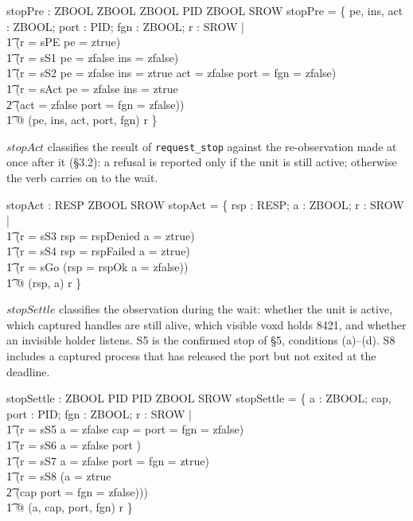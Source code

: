 \documentclass[a4paper,10pt,fleqn]{article}
\begin{document}
\begin{axdef}
  stopPre : ZBOOL \cross ZBOOL \cross ZBOOL \cross \power PID \cross ZBOOL
    \rel SROW
\where
  stopPre = \{ pe, ins, act : ZBOOL; port : \power PID; fgn : ZBOOL;
      r : SROW | \\
  \t1 (r = sPE \land pe = ztrue) \lor \\
  \t1 (r = sS1 \land pe = zfalse \land ins = zfalse) \lor \\
  \t1 (r = sS2 \land pe = zfalse \land ins = ztrue \land act = zfalse
      \land port = \emptyset \land fgn = zfalse) \lor \\
  \t1 (r = sAct \land pe = zfalse \land ins = ztrue \land \\
  \t2 \lnot (act = zfalse \land port = \emptyset \land fgn = zfalse)) \\
  \t1 @ (pe, ins, act, port, fgn) \mapsto r \}
\end{axdef}

$stopAct$ classifies the result of \texttt{request\_stop} against the
re-observation made at once after it (\S3.2): a refusal is reported only if
the unit is still active; otherwise the verb carries on to the wait.

\begin{axdef}
  stopAct : RESP \cross ZBOOL \rel SROW
\where
  stopAct = \{ rsp : RESP; a : ZBOOL; r : SROW | \\
  \t1 (r = sS3 \land rsp = rspDenied \land a = ztrue) \lor \\
  \t1 (r = sS4 \land rsp = rspFailed \land a = ztrue) \lor \\
  \t1 (r = sGo \land (rsp = rspOk \lor a = zfalse)) \\
  \t1 @ (rsp, a) \mapsto r \}
\end{axdef}

$stopSettle$ classifies the observation during the wait: whether the unit is
active, which captured handles are still alive, which visible voxd holds
8421, and whether an invisible holder listens. S5 is the confirmed stop of
\S5, conditions (a)--(d). S8 includes a captured process that has released
the port but not exited at the deadline.

\begin{axdef}
  stopSettle : ZBOOL \cross \power PID \cross \power PID \cross ZBOOL
    \rel SROW
\where
  stopSettle = \{ a : ZBOOL; cap, port : \power PID; fgn : ZBOOL;
      r : SROW | \\
  \t1 (r = sS5 \land a = zfalse \land cap = \emptyset \land port = \emptyset
      \land fgn = zfalse) \lor \\
  \t1 (r = sS6 \land a = zfalse \land port \neq \emptyset) \lor \\
  \t1 (r = sS7 \land a = zfalse \land port = \emptyset \land fgn = ztrue)
      \lor \\
  \t1 (r = sS8 \land (a = ztrue \lor \\
  \t2 (cap \neq \emptyset \land port = \emptyset \land fgn = zfalse))) \\
  \t1 @ (a, cap, port, fgn) \mapsto r \}
\end{axdef}
\end{document}
